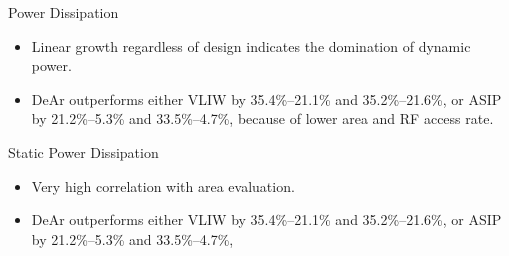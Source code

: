 \documentclass{beamer}
\begin{document}
\begin{CJK}{UTF8}{bkai}
    \begin{frame}{Power Dissipation}
        \begin{figure}[t]
            \begin{center}
            \end{center}
        \end{figure}
        \begin{itemize}
            \item Linear growth regardless of design indicates the domination of dynamic power.
            \item DeAr outperforms either VLIW by 35.4\%--21.1\% and 35.2\%--21.6\%, 
                or ASIP by 21.2\%--5.3\% and 33.5\%--4.7\%, because of lower area and RF access rate.
        \end{itemize}
    \end{frame}

    \begin{frame}{Static Power Dissipation}
        \begin{figure}[t]
            \begin{center}
            \end{center}
        \end{figure}
        \begin{itemize}
            \item Very high correlation with area evaluation.
            \item DeAr outperforms either VLIW by 35.4\%--21.1\% and 35.2\%--21.6\%, 
                or ASIP by 21.2\%--5.3\% and 33.5\%--4.7\%,
        \end{itemize}
    \end{frame}

\end{CJK}
\end{document}
